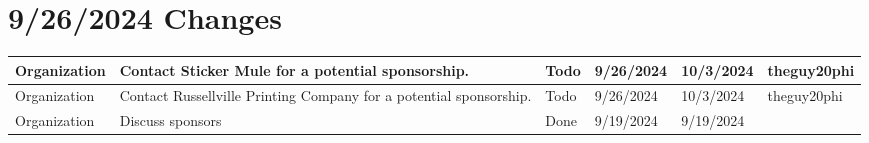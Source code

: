\section{9/26/2024 Changes}
\begin{center}
\begin{longtable}{| p{40pt} | p{150pt} | p{35pt} | p{33pt} | p{33pt} | p{40pt} |}
\hline \rowcolor{IndianRed1}
Organization & Contact Sticker Mule for a potential sponsorship. & Todo & 9/26/2024 & 10/3/2024 & theguy20phi \\
\hline \rowcolor{IndianRed1}
Organization & Contact Russellville Printing Company for a potential sponsorship. & Todo & 9/26/2024 & 10/3/2024 & theguy20phi \\
\hline \rowcolor{DarkSeaGreen1}
Organization & Discuss sponsors & Done & 9/19/2024 & 9/19/2024 & \\
\hline
\end{longtable}
\end{center}


